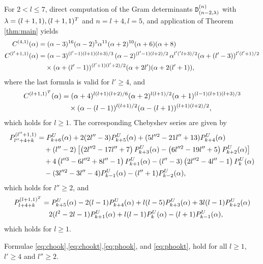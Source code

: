 \mdef For $2<l\leq 7$, direct computation of the Gram determinants ${\mathtt D}^{(n)}_{(n-2,\lambda)}$ with $\lambda=(l+1,1), (l+1,1)^T$ and $n=l+4,l=5$, and application of Theorem \ref{thm:main} yields
\begin{align}
    C^{(4,1)}(\alpha)&=(\alpha -3)^{16} (\alpha -2)^5 \alpha ^{11} (\alpha +2)^{10} (\alpha +6) (\alpha +8)\nonumber\\
    C^{(l'+1,1)}(\alpha)&=(\alpha -3)^{(l'-1)(l+1)(l+3)/3} \, (\alpha -2)^{(l'-1)(l+2)/2} \, \alpha ^{l'('l+3)/2}(\alpha +(l'-3))^{l'(l'+1)/2} \nonumber\\
    &\quad\times (\alpha +(l'-1))^{(l'+1)(l'+2)/2} (\alpha +2l') (\alpha +2(l'+1)),\label{eq:chook}
\end{align}
where the last formula is valid for $l'\geq 4$, and
\begin{align}
        C^{(l+1,1)^T}(\alpha)&=(\alpha+4)^{l(l+1)(l+2)/6}(\alpha+2)^{l(l+1)/2}(\alpha+1)^{(l-1)(l+1)(l+3)/3}\nonumber\\
    &\quad\times(\alpha -(l-1))^{l(l+1)/2} (\alpha -(l+1))^{(l+1)(l+2)/2},\label{eq:chookt}
\end{align}
which holds for $l\geq 1$. The corresponding Chebyshev series are given by
\begin{align}
    P_{l''+4+k}^{(l''+1,1)}&=P^U_{k+6}(\alpha)+2 (2 l''-3) P^U_{k+5}(\alpha)+(5 l''^2-21 l''+13)P^U_{k+4}(\alpha)\nonumber\\
    &\quad +(l''-2) \left[\left(2 l''^2-17 l''+7\right)P^U_{k+3}(\alpha)- \left(6 l''^2-19 l''+5\right) P^U_{k+2}(\alpha)\right]\nonumber\\
    &\quad +4 \left(l''^3-6 l''^2+8 l''-1\right)P^U_{k+1}(\alpha) -(l''-3) \left(2 l''^2-4 l''-1\right)P^U_{k}(\alpha)\nonumber\\
    &\quad-(3 l''^2-3 l''-4)P^U_{k-1}(\alpha)-(l''+1)P^U_{k-2}(\alpha),\label{eq:phook}\end{align}
which holds for $l''\geq2$, and 
\begin{align}
    P_{l+4+k}^{(l+1,1)^T}&=P^U_{k+5}(\alpha)-2 (l-1) P^U_{k+4}(\alpha)+l(l-5)P^U_{k+3}(\alpha)+3l(l-1)P^U_{k+2}(\alpha)\nonumber\\
    &\quad 2(l^2-2l-1) P^U_{k+1}(\alpha)+l(l-1)P^U_{k}(\alpha)-(l+1)P^U_{k-1}(\alpha),\label{eq:phookt}
\end{align}
which holds for $l\geq 1$.

 \begin{conjecture}Formulae \eqref{eq:chook},\eqref{eq:chookt},\eqref{eq:phook}, and \eqref{eq:phookt}, hold for all $l\geq 1$, $l'\geq 4$ and $l''\geq 2$.     
 \end{conjecture}
\medskip 

